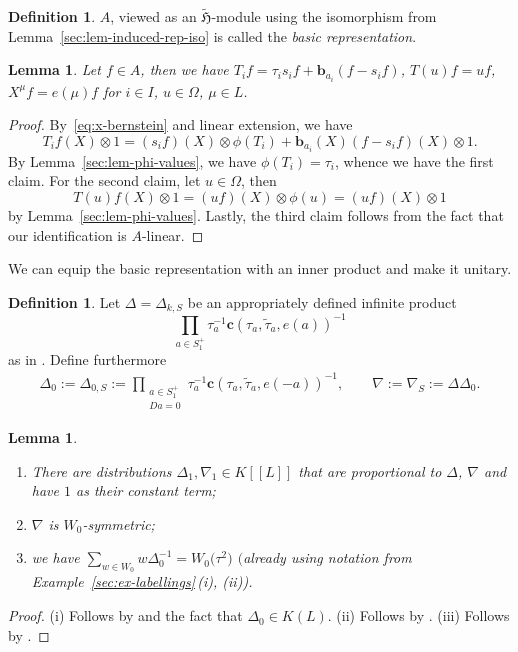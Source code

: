 \documentclass[10pt,a4paper]{amsart}
\newtheorem{Lemma}[Theorem]{Lemma}
\theoremstyle{definition}
\newtheorem{Definition}[Theorem]{Definition}
\numberwithin{equation}{section}
\begin{document}
\begin{Definition}
 $A$, viewed as an $\tilde{\mathfrak{H}}$-module using the isomorphism from
 Lemma~\ref{sec:lem-induced-rep-iso} is called the \emph{basic representation}.
\end{Definition}

\begin{Lemma}\label{sec:lem-concrete-basic-rep}
 Let $f\in A$, then we have
$
 T_i f = \tau_i s_i f + \bm{b}_{a_i} (f - s_i f)$, $
 T(u) f = uf$, $
 X^\mu f = e(\mu)f
$
 for $i\in I$, $u\in\Omega$, $\mu\in L$.
\end{Lemma}
\begin{proof}
 By~\eqref{eq:x-bernstein} and linear extension, we have
 \[
 T_i f(X)\otimes 1 = (s_if)(X)\otimes \phi(T_i) + \bm{b}_{a_i}(X)(f-s_if)(X)\otimes 1.
 \]
 By Lemma~\ref{sec:lem-phi-values}, we have $\phi(T_i)=\tau_i$, whence
 we have the first claim. For the second claim, let $u\in \Omega$, then
 \[
 T(u)f(X)\otimes 1 = (uf)(X)\otimes\phi(u)
 = (uf)(X)\otimes 1
 \]
 by Lemma~\ref{sec:lem-phi-values}. Lastly, the third claim follows from the fact that our identification
 is $A$-linear.
\end{proof}

We can equip the basic representation with an inner product and make it
unitary.

\begin{Definition}\label{sec:def-deltas-nabla}
 Let $\Delta=\Delta_{k,S}$ be
 an appropriately defined infinite product
 \[
 \prod_{a\in S_1^+} \tau_a^{-1}\bm{c}(\tau_a,\tilde{\tau}_a, e(a))^{-1}
 \]
 as in \cite[Section~5.1.7\,ff]{macdonald}.
 Define furthermore
 \begin{align*}
 \Delta_0:= \Delta_{0,S}:= \prod_{\substack{a\in S_1^+\\Da=0}}
 \tau_a^{-1}\bm{c}(\tau_a,\tilde{\tau}_a,e(-a))^{-1},\qquad
 \nabla:= \nabla_S :=
 \Delta\Delta_0.
 \end{align*}
\end{Definition}

\begin{Lemma}\label{lem-weight-distributions}\quad
 \begin{enumerate}\itemsep=0pt
 \item[$(i)$] There are distributions $\Delta_1,\nabla_1\in K[[L]]$ that are proportional to
 $\Delta$, $\nabla$ and have $1$ as their constant term;
 \item[$(ii)$] $\nabla$ is $W_0$-symmetric;
 \item[$(iii)$] we have
$
 \sum_{w\in W_0} w\Delta_0^{-1} = W_0\bigl(\tau^2\bigr)
$
$($already using notation from Example~{\rm \ref{sec:ex-labellings}\,(i), (ii))}.
 \end{enumerate}
\end{Lemma}
\begin{proof}
(i) Follows by \cite[Section~5.1.10]{macdonald}
 and the fact that $\Delta_0\in K(L)$.
(ii) Follows by \cite[Section~5.1.27]{macdonald}.
(iii) Follows by \cite[Section~5.1.36]{macdonald}.
\end{proof}
\end{document}
